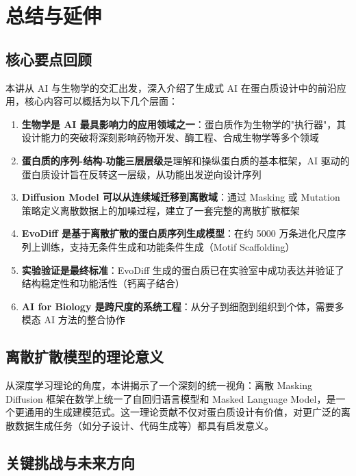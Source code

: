 \section{总结与延伸}

\subsection{核心要点回顾}

本讲从 AI 与生物学的交汇出发，深入介绍了生成式 AI 在蛋白质设计中的前沿应用，核心内容可以概括为以下几个层面：

\begin{enumerate}
    \item \textbf{生物学是 AI 最具影响力的应用领域之一}：蛋白质作为生物学的"执行器"，其设计能力的突破将深刻影响药物开发、酶工程、合成生物学等多个领域

    \item \textbf{蛋白质的序列-结构-功能三层层级}是理解和操纵蛋白质的基本框架，AI 驱动的蛋白质设计旨在反转这一层级，从功能出发逆向设计序列

    \item \textbf{Diffusion Model 可以从连续域迁移到离散域}：通过 Masking 或 Mutation 策略定义离散数据上的加噪过程，建立了一套完整的离散扩散框架

    \item \textbf{EvoDiff 是基于离散扩散的蛋白质序列生成模型}：在约 5000 万条进化尺度序列上训练，支持无条件生成和功能条件生成（Motif Scaffolding）

    \item \textbf{实验验证是最终标准}：EvoDiff 生成的蛋白质已在实验室中成功表达并验证了结构稳定性和功能活性（钙离子结合）

    \item \textbf{AI for Biology 是跨尺度的系统工程}：从分子到细胞到组织到个体，需要多模态 AI 方法的整合协作
\end{enumerate}

\subsection{离散扩散模型的理论意义}

从深度学习理论的角度，本讲揭示了一个深刻的统一视角：离散 Masking Diffusion 框架在数学上统一了自回归语言模型和 Masked Language Model，是一个更通用的生成建模范式。这一理论贡献不仅对蛋白质设计有价值，对更广泛的离散数据生成任务（如分子设计、代码生成等）都具有启发意义。

\subsection{关键挑战与未来方向}

